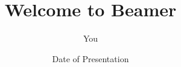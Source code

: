 \documentclass{beamer}
\title{Welcome to Beamer}
\author{You}
\institute{Where You're From}
\date{Date of Presentation}
\begin{document}
\begin{frame}
\titlepage
\end{frame}
\end{document}
